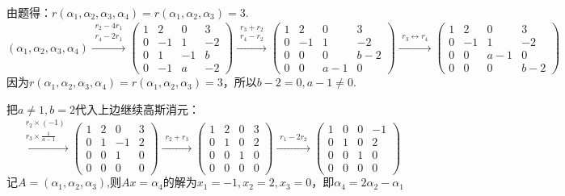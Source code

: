 \documentclass[a4paper]{report}
\begin{document}
\begin{jie}
由题得：$r(\alpha_1,\alpha_2,\alpha_3,\alpha_4)=r(\alpha_1,\alpha_2,\alpha_3)=3$.
\begin{equation*}
(\alpha_1,\alpha_2,\alpha_3,\alpha_4)
\xrightarrow{\substack{r_{2}-4r_{1}\\ r_4-2r_1}}
{
\begin{pmatrix}
1&2&0&3\\
0&-1&1&-2\\
0&1&-1&b\\
0&-1&a&-2
\end{pmatrix}
}\xrightarrow{\substack{r_{3}+r_{2}\\ r_4-r_2}}
{
\begin{pmatrix}
1&2&0&3\\
0&-1&1&-2\\
0&0&0&b-2\\
0&0&a-1&0
\end{pmatrix}
}\xrightarrow{\substack{r_{3}\leftrightarrow r_4}}
{
\begin{pmatrix}
1&2&0&3\\
0&-1&1&-2\\
0&0&a-1&0\\
0&0&0&b-2
\end{pmatrix}
}
\end{equation*}
因为$r(\alpha_1,\alpha_2,\alpha_3,\alpha_4)=r(\alpha_1,\alpha_2,\alpha_3)=3$，所以$b-2=0,a-1\neq0$.

把$a\neq1,b=2$代入上边继续高斯消元：
\begin{equation*}
\xrightarrow{\substack{r_2\times(-1)\\ r_{3}\times\frac{1}{a-1}}}
{
\begin{pmatrix}
1&2&0&3\\
0&1&-1&2\\
0&0&1&0\\
0&0&0&0
\end{pmatrix}
}\xrightarrow{\substack{r_2+ r_{3}}}
{
\begin{pmatrix}
1&2&0&3\\
0&1&0&2\\
0&0&1&0\\
0&0&0&0
\end{pmatrix}
}\xrightarrow{\substack{r_1- 2r_{2}}}
{
\begin{pmatrix}
1&0&0&-1\\
0&1&0&2\\
0&0&1&0\\
0&0&0&0
\end{pmatrix}
}
\end{equation*}
记$A=(\alpha_1,\alpha_2,\alpha_3)$,则$Ax=\alpha_4$的解为$x_1=-1,x_2=2,x_3=0$，即$\alpha_4=2\alpha_2-\alpha_1$
\end{jie}
\end{document}
